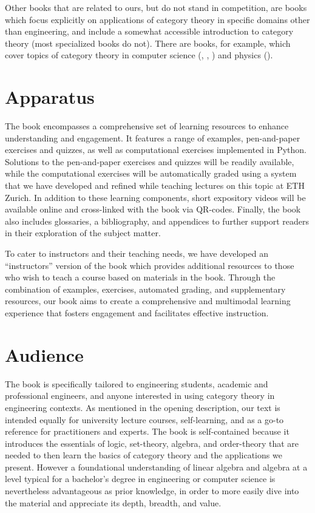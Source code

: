 \documentclass[10pt, article, one side]{memoir}
\begin{document}
    Other books that are related to ours, but do not stand in competition, are books which focus explicitly on applications of category theory in specific domains other than engineering, and include a somewhat accessible introduction to category theory (most specialized books do not).
    There are books, for example, which cover topics of category theory in computer science (\cite{BarrWells},  \cite{Milewski}, \cite{Pierce}) and physics (\cite{CoeckeKisssinger}).

    \section{Apparatus}
    The book encompasses a comprehensive set of learning resources to enhance understanding and engagement. It features a range of examples, pen-and-paper exercises and quizzes, as well as computational exercises implemented in Python. Solutions to the pen-and-paper exercises and quizzes will be readily available, while the computational exercises will be automatically graded using a system that we have developed and refined while teaching lectures on this topic at ETH Zurich. In addition to these learning components, short expository videos will be available online and cross-linked with the book via QR-codes. Finally, the book also includes glossaries, a bibliography, and appendices to further support readers in their exploration of the subject matter.

    To cater to instructors and their teaching needs, we have developed an ``instructors'' version of the book which provides additional resources to those who wish to teach a course based on materials in the book. Through the combination of examples, exercises, automated grading, and supplementary resources, our book aims to create a comprehensive and multimodal learning experience that fosters engagement and facilitates effective instruction.

    \section{Audience}
    The book is specifically tailored to engineering students, academic and professional engineers, and anyone interested in using category theory in engineering contexts. As mentioned in the opening description, our text is intended equally for university lecture courses, self-learning, and as a go-to reference for practitioners and experts. The book is self-contained because it introduces the essentials of logic, set-theory, algebra, and order-theory that are needed to then learn the basics of category theory and the applications we present. However a foundational understanding of linear algebra and algebra at a level typical for a bachelor's degree in engineering or computer science is nevertheless advantageous as prior knowledge, in order to more easily dive into the material and appreciate its depth, breadth, and value. 
\end{document}
